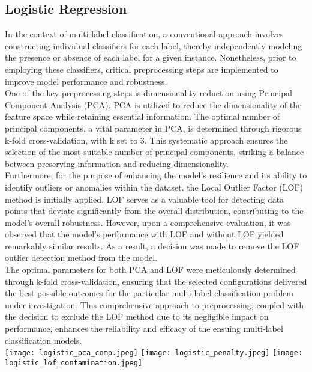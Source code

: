 \documentclass{article}
\begin{document}
\begin{multicols}{2}
\subsection{Logistic Regression}
In the context of multi-label classification, a conventional approach involves constructing individual classifiers for each label, thereby independently modeling the presence or absence of each label for a given instance. Nonetheless, prior to employing these classifiers, critical preprocessing steps are implemented to improve model performance and robustness.\\
One of the key preprocessing steps is dimensionality reduction using Principal Component Analysis (PCA). PCA is utilized to reduce the dimensionality of the feature space while retaining essential information. The optimal number of principal components, a vital parameter in PCA, is determined through rigorous k-fold cross-validation, with k set to 3. This systematic approach ensures the selection of the most suitable number of principal components, striking a balance between preserving information and reducing dimensionality.\\
Furthermore, for the purpose of enhancing the model's resilience and its ability to identify outliers or anomalies within the dataset, the Local Outlier Factor (LOF) method is initially applied. LOF serves as a valuable tool for detecting data points that deviate significantly from the overall distribution, contributing to the model's overall robustness. However, upon a comprehensive evaluation, it was observed that the model's performance with LOF and without LOF yielded remarkably similar results. As a result, a decision was made to remove the LOF outlier detection method from the model.\\
The optimal parameters for both PCA and LOF were meticulously determined through k-fold cross-validation, ensuring that the selected configurations delivered the best possible outcomes for the particular multi-label classification problem under investigation. This comprehensive approach to preprocessing, coupled with the decision to exclude the LOF method due to its negligible impact on performance, enhances the reliability and efficacy of the ensuing multi-label classification models.\\
\texttt{[image: logistic\_pca\_comp.jpeg]}
\texttt{[image: logistic\_penalty.jpeg]}
\texttt{[image: logistic\_lof\_contamination.jpeg]}


\end{multicols}
\end{document}
